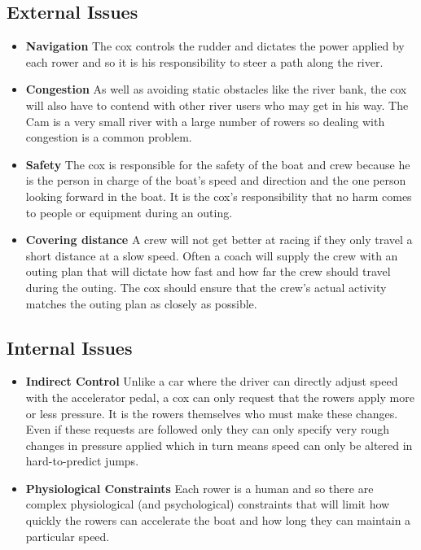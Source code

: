 \subsection{External Issues}
\begin{itemize}
  
  \item{\textbf{Navigation}} The cox controls the rudder and dictates the power applied by each rower and so it is his responsibility to steer a path along the river.
  
  \item{\textbf{Congestion}} As well as avoiding static obstacles like
    the river bank, the cox will also have to contend with other river users who may get in his way. The Cam is a very small river with a large number of rowers so dealing with congestion is a common problem.
  
  \item{\textbf{Safety}} The cox is responsible for the safety of the
    boat and crew because he is the person in charge of the boat's
    speed and direction and the one person looking forward in the
    boat. It is the cox's responsibility that no harm comes to people
    or equipment during an outing.
  
  \item{\textbf{Covering distance}} A crew will not get better at racing if they only travel a short distance at a slow speed. Often a coach will supply the crew with an outing plan that will dictate how fast and how far the crew should travel during the outing. The cox should ensure that the crew's actual activity matches the outing plan as closely as possible.
  
\end{itemize}

\subsection{Internal Issues}
\begin{itemize}
  \item{\textbf{Indirect Control}} Unlike a car where the driver can directly adjust speed with the accelerator pedal, a cox can only request that the rowers apply more or less pressure. It is the rowers themselves who must make these changes. Even if these requests are followed only they can only specify very rough changes in pressure applied which in turn means speed can only be altered in hard-to-predict jumps.
  
  \item{\textbf{Physiological Constraints}} \label{physiocons} Each rower is a human and so there are complex physiological (and psychological) constraints that will limit how quickly the rowers can accelerate the boat and how long they can maintain a particular speed.
\end{itemize}

